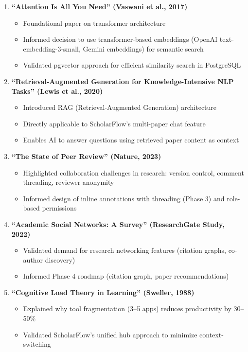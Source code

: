 \begin{enumerate}
    \item \textbf{``Attention Is All You Need'' (Vaswani et al., 2017)}
          \begin{itemize}
              \item Foundational paper on transformer architecture
              \item Informed decision to use transformer-based embeddings (OpenAI text-embedding-3-small, Gemini embeddings) for semantic search
              \item Validated pgvector approach for efficient similarity search in PostgreSQL
          \end{itemize}

    \item \textbf{``Retrieval-Augmented Generation for Knowledge-Intensive NLP Tasks'' (Lewis et al., 2020)}
          \begin{itemize}
              \item Introduced RAG (Retrieval-Augmented Generation) architecture
              \item Directly applicable to ScholarFlow's multi-paper chat feature
              \item Enables AI to answer questions using retrieved paper content as context
          \end{itemize}

    \item \textbf{``The State of Peer Review'' (Nature, 2023)}
          \begin{itemize}
              \item Highlighted collaboration challenges in research: version control, comment threading, reviewer anonymity
              \item Informed design of inline annotations with threading (Phase 3) and role-based permissions
          \end{itemize}

    \item \textbf{``Academic Social Networks: A Survey'' (ResearchGate Study, 2022)}
          \begin{itemize}
              \item Validated demand for research networking features (citation graphs, co-author discovery)
              \item Informed Phase 4 roadmap (citation graph, paper recommendations)
          \end{itemize}

    \item \textbf{``Cognitive Load Theory in Learning'' (Sweller, 1988)}
          \begin{itemize}
              \item Explained why tool fragmentation (3--5 apps) reduces productivity by 30--50\%
              \item Validated ScholarFlow's unified hub approach to minimize context-switching
          \end{itemize}
\end{enumerate}

